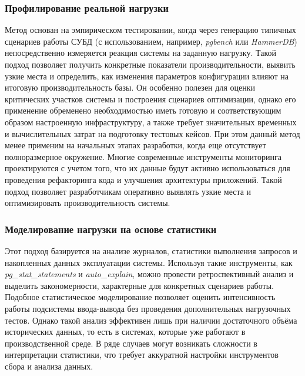 \subsubsection{Профилирование реальной нагрузки}
Метод основан на эмпирическом тестировании, когда через генерацию типичных сценариев работы СУБД (с использованием, например, 
\textit{pgbench} или \textit{HammerDB}) непосредственно измеряется реакция системы на заданную нагрузку. 
Такой подход позволяет получить конкретные показатели производительности, выявить узкие места и определить, 
как изменения параметров конфигурации влияют на итоговую производительность базы. Он особенно полезен для оценки критических 
участков системы и построения сценариев оптимизации, однако его применение обременено необходимостью иметь готовую и 
соответствующим образом настроенную инфраструктуру, а также требует значительных временных и вычислительных затрат на 
подготовку тестовых кейсов. При этом данный метод менее применим на начальных этапах разработки, когда еще отсутствует 
полноразмерное окружение. \cite{han2021cardinality}
Многие современные инструменты мониторинга проектируются с учетом того, что их данные будут активно использоваться для 
проведения рефакторинга кода и улучшения архитектуры приложений. Такой подход позволяет разработчикам оперативно выявлять 
узкие места и оптимизировать производительность системы. \cite{alfara2023razrabotka}

\subsubsection{Моделирование нагрузки на основе статистики}
Этот подход базируется на анализе журналов, статистики выполнения запросов и накопленных данных эксплуатации системы. 
Используя такие инструменты, как \textit{pg\_stat\_statements} и \textit{auto\_explain}, можно провести ретроспективный анализ 
и выделить закономерности, характерные для конкретных сценариев работы. Подобное статистическое моделирование позволяет оценить 
интенсивность работы подсистемы ввода-вывода без проведения дополнительных нагрузочных тестов. Однако такой анализ эффективен 
лишь при наличии достаточного объёма исторических данных, то есть в системах, которые уже работают в производственной среде. 
В ряде случаев могут возникать сложности в интерпретации статистики, что требует аккуратной настройки инструментов сбора и анализа данных.

